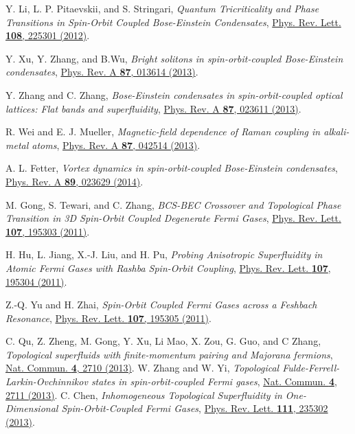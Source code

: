 \documentclass[twocolumn,pra,unsortedaddress,showpacs,floatfix,citeautoscript,nofootinbib]{revtex4-1}
\begin{document}
\begin{thebibliography}{99}
 Y. Li, L. P. Pitaevskii, and S. Stringari, \emph{Quantum Tricriticality and Phase Transitions in Spin-Orbit Coupled Bose-Einstein Condensates}, \href{http://dx.doi.org/10.1103/PhysRevLett.108.225301}%
{Phys. Rev. Lett. \textbf{108}, 225301 (2012)}.

 Y. Xu, Y. Zhang, and B.Wu, \emph{Bright solitons in spin-orbit-coupled Bose-Einstein condensates}, \href{http://dx.doi.org/10.1103/PhysRevA.87.013614}%
{Phys. Rev. A \textbf{87}, 013614 (2013)}.

Y. Zhang and C. Zhang, \emph{Bose-Einstein condensates in spin-orbit-coupled optical lattices: Flat bands and
superfluidity},
\href{http://dx.doi.org/10.1103/PhysRevA.87.023611}{Phys. Rev. A
\textbf{87}, 023611 (2013)}.

 R. Wei and E. J. Mueller, \emph{Magnetic-field dependence of Raman coupling in alkali-metal atoms}, \href{http://dx.doi.org/10.1103/PhysRevA.87.042514}%
{Phys. Rev. A \textbf{87}, 042514 (2013)}.

 A. L. Fetter, \emph{Vortex dynamics in spin-orbit-coupled Bose-Einstein
condensates},
\href{http://dx.doi.org/10.1103/PhysRevA.89.023629}{Phys. Rev. A
\textbf{89}, 023629 (2014)}.


 M. Gong, S. Tewari, and C. Zhang, \emph{BCS-BEC Crossover and Topological Phase Transition in 3D Spin-Orbit Coupled Degenerate Fermi Gases}, \href{http://dx.doi.org/10.1103/PhysRevLett.107.195303}%
{Phys. Rev. Lett. \textbf{107}, 195303 (2011)}.

 H. Hu, L. Jiang, X.-J. Liu, and H. Pu, \emph{Probing Anisotropic Superfluidity in Atomic Fermi Gases with Rashba Spin-Orbit Coupling}, \href{http://dx.doi.org/10.1103/PhysRevLett.107.195304}%
{Phys. Rev. Lett. \textbf{107}, 195304 (2011)}.

 Z.-Q. Yu and H. Zhai, \emph{Spin-Orbit Coupled Fermi Gases across a Feshbach Resonance}, \href{http://dx.doi.org/10.1103/PhysRevLett.107.195305}%
{Phys. Rev. Lett. \textbf{107}, 195305 (2011)}.

C. Qu, Z. Zheng, M. Gong, Y. Xu, Li Mao, X. Zou, G. Guo, and C Zhang, \emph{Topological superfluids with finite-momentum pairing and Majorana fermions}, \href{http://dx.doi.org/10.1038/ncomms3710}{Nat. Commun. \textbf{4}, 2710 (2013)}.
W. Zhang and W. Yi, \emph{Topological Fulde-Ferrell-Larkin-Ovchinnikov states in spin-orbit-coupled Fermi gases}, \href{http://dx.doi.org/10.1038/ncomms3711}{Nat. Commun. \textbf{4}, 2711 (2013)}.
C. Chen, \emph{Inhomogeneous Topological Superfluidity in One-Dimensional Spin-Orbit-Coupled Fermi Gases}, \href{http://dx.doi.org/10.1103/PhysRevLett.111.235302}{Phys. Rev. Lett. \textbf{111}, 235302 (2013)}.


\end{thebibliography}
\end{document}
